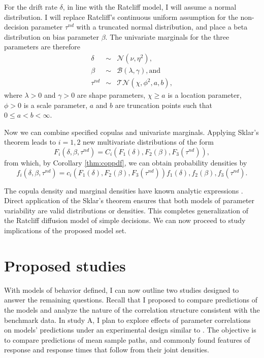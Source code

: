 \documentclass[12pt]{report}
\begin{document}
For the drift rate $\delta$, in line with the
Ratcliff model, I will assume a normal distribution. I will
replace Ratcliff's continuous uniform assumption for the non-decision
parameter $\tau^{nd}$ with a truncated normal distribution,
and place a beta distribution on bias parameter
$\beta$. The univariate marginals for the three parameters are therefore
%
\begin{eqnarray}
\delta & \sim & \mathcal{N}(\nu, \eta^2), \nonumber \\
\beta & \sim & \mathcal{B}(\lambda, \gamma), \text{and} \nonumber \\
\tau^{nd} & \sim & \mathcal{TN}(\chi,\phi^2,a,b),
\end{eqnarray}
 where $\lambda > 0$ and $\gamma > 0$ are shape parameters, $\chi \geq a$ is a location parameter, $\phi > 0$ is a scale parameter, $a$ and $b$ are truncation points such that $0 \leq a < b < \infty$. 
 
Now we can combine specified copulas and univariate marginals. Applying Sklar's theorem leads to
$i = 1, 2$ new multivariate distributions of the form
%
\begin{equation}
F_i(\delta,\beta,\tau^{nd}) = C_i(F_1(\delta),F_2(\beta),F_3(\tau^{nd})),
\end{equation}
%
from which, by Corollary \ref{thm:coppdf}, we can obtain probability densities by 
%
\begin{equation}
f_i(\delta,\beta,\tau^{nd}) 
   = c_i(F_1(\delta),
         F_2(\beta),
         F_3(\tau^{nd}))
         f_1(\delta),f_2(\beta),f_3(\tau^{nd}).
\end{equation}
 
The copula density and marginal densities have known analytic
expressions
\citep{Nel2007,CasBer2002,JohKot1994,JohKot1995}.  Direct application
of the Sklar's theorem ensures that both models of parameter
variability are valid distributions or densities. 
This completes generalization of the Ratcliff
diffusion model of simple decisions. We can now proceed to study implications of the proposed model set.

\chapter{Proposed studies}

With models of behavior defined, I can now outline two studies designed to answer the remaining questions. Recall that I proposed to compare predictions of the models and analyze the nature of the correlation structure consistent with the benchmark data. In study A, I plan to explore effects of parameter correlations on models' predictions under an experimental design similar to \citet{RatRou1998}. The objective is to compare predictions of mean sample paths, and commonly found features of response and response times that follow from their joint densities.
\end{document}
